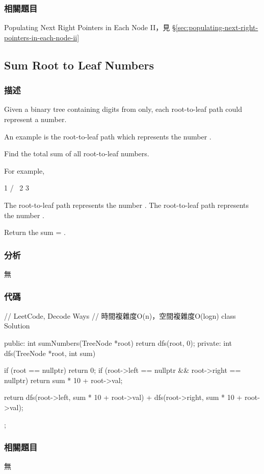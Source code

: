 \subsubsection{相關題目}
\begindot
\item Populating Next Right Pointers in Each Node II，見 \S \ref{sec:populating-next-right-pointers-in-each-node-ii}
\myenddot


\subsection{Sum Root to Leaf Numbers} %
\label{sec:sum-root-to-leaf-numbers}


\subsubsection{描述}
Given a binary tree containing digits from  only, each root-to-leaf path could represent a number.

An example is the root-to-leaf path  which represents the number .

Find the total sum of all root-to-leaf numbers.

For example,
\begin{Code}
    1
   / \
  2   3
\end{Code}

The root-to-leaf path  represents the number .
The root-to-leaf path  represents the number .

Return the sum = .


\subsubsection{分析}
無

\subsubsection{代碼}

\begin{Code}
// LeetCode, Decode Ways
// 時間複雜度O(n)，空間複雜度O(logn)
class Solution {
public:
    int sumNumbers(TreeNode *root) {
        return dfs(root, 0);
    }
private:
    int dfs(TreeNode *root, int sum) {
        if (root == nullptr) return 0;
        if (root->left == nullptr && root->right == nullptr)
            return sum * 10 + root->val;

        return dfs(root->left, sum * 10 + root->val) +
                dfs(root->right, sum * 10 + root->val);
    }
};
\end{Code}


\subsubsection{相關題目}
\begindot
\item 無
\myenddot
